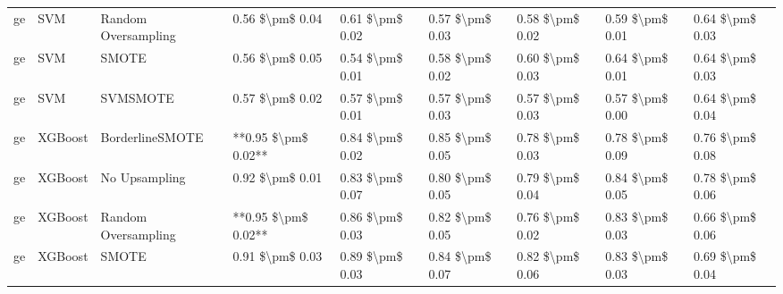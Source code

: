\begin{tabular}{lllllllll}
      ge &                             SVM &           Random Oversampling &     0.56 \$\textbackslash pm\$ 0.04 &           0.61 \$\textbackslash pm\$ 0.02 &       0.57 \$\textbackslash pm\$ 0.03 &        0.58 \$\textbackslash pm\$ 0.02 &                         0.59 \$\textbackslash pm\$ 0.01 &     0.64 \$\textbackslash pm\$ 0.03 \\
      ge &                             SVM &                         SMOTE &     0.56 \$\textbackslash pm\$ 0.05 &           0.54 \$\textbackslash pm\$ 0.01 &       0.58 \$\textbackslash pm\$ 0.02 &        0.60 \$\textbackslash pm\$ 0.03 &                         0.64 \$\textbackslash pm\$ 0.01 &     0.64 \$\textbackslash pm\$ 0.03 \\
      ge &                             SVM &                      SVMSMOTE &     0.57 \$\textbackslash pm\$ 0.02 &           0.57 \$\textbackslash pm\$ 0.01 &       0.57 \$\textbackslash pm\$ 0.03 &        0.57 \$\textbackslash pm\$ 0.03 &                         0.57 \$\textbackslash pm\$ 0.00 &     0.64 \$\textbackslash pm\$ 0.04 \\
      ge &                         XGBoost &               BorderlineSMOTE & **0.95 \$\textbackslash pm\$ 0.02** &           0.84 \$\textbackslash pm\$ 0.02 &       0.85 \$\textbackslash pm\$ 0.05 &        0.78 \$\textbackslash pm\$ 0.03 &                         0.78 \$\textbackslash pm\$ 0.09 &     0.76 \$\textbackslash pm\$ 0.08 \\
      ge &                         XGBoost &                 No Upsampling &     0.92 \$\textbackslash pm\$ 0.01 &           0.83 \$\textbackslash pm\$ 0.07 &       0.80 \$\textbackslash pm\$ 0.05 &        0.79 \$\textbackslash pm\$ 0.04 &                         0.84 \$\textbackslash pm\$ 0.05 &     0.78 \$\textbackslash pm\$ 0.06 \\
      ge &                         XGBoost &           Random Oversampling & **0.95 \$\textbackslash pm\$ 0.02** &           0.86 \$\textbackslash pm\$ 0.03 &       0.82 \$\textbackslash pm\$ 0.05 &        0.76 \$\textbackslash pm\$ 0.02 &                         0.83 \$\textbackslash pm\$ 0.03 &     0.66 \$\textbackslash pm\$ 0.06 \\
      ge &                         XGBoost &                         SMOTE &     0.91 \$\textbackslash pm\$ 0.03 &           0.89 \$\textbackslash pm\$ 0.03 &       0.84 \$\textbackslash pm\$ 0.07 &        0.82 \$\textbackslash pm\$ 0.06 &                         0.83 \$\textbackslash pm\$ 0.03 &     0.69 \$\textbackslash pm\$ 0.04 \\

\end{tabular}
